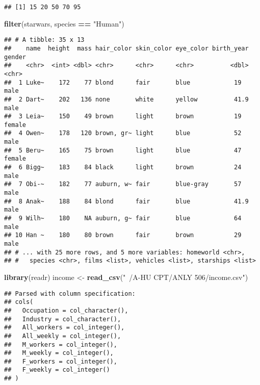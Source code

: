 \documentclass[]{article}
\newenvironment{Shaded}{\begin{snugshade}}{\end{snugshade}}
\newcommand{\KeywordTok}[1]{\textcolor[rgb]{0.13,0.29,0.53}{\textbf{#1}}}
\newcommand{\StringTok}[1]{\textcolor[rgb]{0.31,0.60,0.02}{#1}}
\newcommand{\OperatorTok}[1]{\textcolor[rgb]{0.81,0.36,0.00}{\textbf{#1}}}
\newcommand{\NormalTok}[1]{#1}
\begin{document}
\begin{verbatim}
## [1] 15 20 50 70 95
\end{verbatim}

\begin{Shaded}
\begin{Highlighting}[]
\KeywordTok{filter}\NormalTok{(starwars, species }\OperatorTok{==}\StringTok{ "Human"}\NormalTok{)}
\end{Highlighting}
\end{Shaded}

\begin{verbatim}
## # A tibble: 35 x 13
##    name  height  mass hair_color skin_color eye_color birth_year gender
##    <chr>  <int> <dbl> <chr>      <chr>      <chr>          <dbl> <chr> 
##  1 Luke~    172    77 blond      fair       blue            19   male  
##  2 Dart~    202   136 none       white      yellow          41.9 male  
##  3 Leia~    150    49 brown      light      brown           19   female
##  4 Owen~    178   120 brown, gr~ light      blue            52   male  
##  5 Beru~    165    75 brown      light      blue            47   female
##  6 Bigg~    183    84 black      light      brown           24   male  
##  7 Obi-~    182    77 auburn, w~ fair       blue-gray       57   male  
##  8 Anak~    188    84 blond      fair       blue            41.9 male  
##  9 Wilh~    180    NA auburn, g~ fair       blue            64   male  
## 10 Han ~    180    80 brown      fair       brown           29   male  
## # ... with 25 more rows, and 5 more variables: homeworld <chr>,
## #   species <chr>, films <list>, vehicles <list>, starships <list>
\end{verbatim}

\begin{Shaded}
\begin{Highlighting}[]
\KeywordTok{library}\NormalTok{(readr)}
\NormalTok{income <-}\StringTok{ }\KeywordTok{read_csv}\NormalTok{(}\StringTok{"~/A-HU CPT/ANLY 506/income.csv"}\NormalTok{)}
\end{Highlighting}
\end{Shaded}

\begin{verbatim}
## Parsed with column specification:
## cols(
##   Occupation = col_character(),
##   Industry = col_character(),
##   All_workers = col_integer(),
##   All_weekly = col_integer(),
##   M_workers = col_integer(),
##   M_weekly = col_integer(),
##   F_workers = col_integer(),
##   F_weekly = col_integer()
## )
\end{verbatim}
\end{document}
